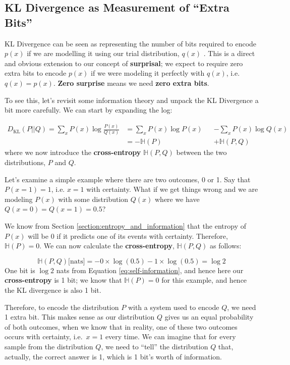 \documentclass[]{article}
\begin{document}
\subsection{KL Divergence as Measurement of ``Extra Bits''}\label{appendix:kl_divergence_bits}

KL Divergence can be seen as representing the number of bits required to encode $p(x)$ if we are modelling it using our trial distribution, $q(x)$ \cite{haase2017information}. This is a direct and obvious extension to our concept of \textbf{surprisal}; we expect to require zero extra bits to encode $p(x)$ if we were modeling it perfectly with $q(x)$, i.e.\ $q(x)=p(x)$. \textbf{Zero surprise} means we need \textbf{zero extra bits}.

To see this, let's revisit some information theory and unpack the KL Divergence a bit more carefully. We can start by expanding the log:

\begin{align}\label{eq:KL_div_expanded}
    D_\text{KL}(P||Q) = \sum_x P(x) \log \frac{P(x)}{Q(x)} 
    &= \sum_x P(x)\log P(x) &&- \sum_x P(x) \log Q(x) 
    \\
    &= -\mathbb{H}(P) &&+ \mathbb{H}(P, Q)
\end{align}
where we now introduce the \textbf{cross-entropy} $\mathbb{H}(P, Q)$ between the two distributions, $P$ and $Q$. 

Let's examine a simple example where there are two outcomes, 0 or 1. Say that $P(x=1) = 1$, i.e. $x=1$ with certainty. What if we get things wrong and we are modeling $P(x)$ with some distribution $Q(x)$ where we have $Q(x=0)=Q(x=1)=0.5$? 

We know from Section \ref{section:entropy_and_information} that the entropy of $P(x)$ will be 0 if it predicts one of its events with certainty. Therefore, $\mathbb{H}(P) = 0$. We can now calculate the \textbf{cross-entropy}, $\mathbb{H}(P, Q)$ as follows:

\begin{equation}
    \mathbb{H}(P, Q) \text{[nats]} = -0\times\log(0.5) -1 \times \log(0.5) = \log2
\end{equation}
One bit is $\log2$ nats from Equation \ref{eq:self-information}, and hence here our \textbf{cross-entropy} is 1 bit; we know that $\mathbb{H}(P)=0$ for this example, and hence the KL divergence is also 1 bit. 

Therefore, to encode the distribution $P$ with a system used to encode $Q$, we need 1 extra bit. This makes sense as our distribution $Q$ gives us an equal probability of both outcomes, when we know that in reality, one of these two outcomes occurs with certainty, i.e.\ $x=1$ every time. We can imagine that for every sample from the distribution $Q$, we need to ``tell'' the distribution $Q$ that, actually, the correct answer is 1, which is 1 bit's worth of information.
\end{document}
